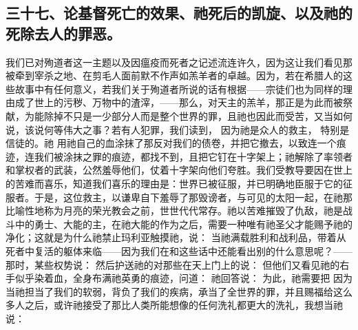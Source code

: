 \subsection{三十七、论基督死亡的效果、祂死后的凯旋、以及祂的死除去人的罪恶。}

我们已对殉道者这一主题以及因瘟疫而死者之记述流连许久，因为这让我们看见那被牵到宰杀之地、在剪毛人面前默不作声如羔羊者的卓越。因为，若在希腊人的这些故事中有任何意义，若我们关于殉道者所说的话有根据——宗徒们也为同样的理由成了世上的污秽、万物中的渣滓，——那么，对天主的羔羊，那正是为此而被祭献，为能除掉不只是一少部分人而是整个世界的罪，且祂也因此而受苦，又当如何说，该说何等伟大之事？若有人犯罪，我们读到，  因为祂是众人的救主， 特别是信徒的。祂 用祂自己的血涂抹了那反对我们的债卷，并把它撤去，以致连一个痕迹，连我们被涂抹之罪的痕迹，都找不到，且把它钉在十字架上；祂解除了率领者和掌权者的武装，公然羞辱他们，仗着十字架向他们夸胜。我们受教导要因在世上的苦难而喜乐，知道我们喜乐的理由是：世界已被征服，并已明确地臣服于它的征服者。于是，这位救主，以谦卑自下羞辱了那毁谤者，与可见的太阳一起，在祂那比喻性地称为月亮的荣光教会之前，世世代代常存。祂以苦难摧毁了仇敌，祂是战斗中的勇士、大能的主，在祂大能的作为之后，需要一种唯有祂圣父才能赐予祂的净化；这就是为什么祂禁止玛利亚触摸祂，说：  当祂满载胜利和战利品，带着从死者中复活的躯体来临——因为我们在和这些话中还能看出别的什么意思呢？——那时，某些权势说：  然后护送祂的对那些在天上门上的说： 但他们又看见祂的右手似乎染着血，全身布满祂英勇的痕迹，问道： 祂回答说： 为此，祂需要把  因为当祂担当了我们的软弱，背负了我们的疾病，承当了全世界的罪，并且赐福给这么多人之后，或许祂接受了那比人类所能想像的任何洗礼都更大的洗礼，我想当祂说：  